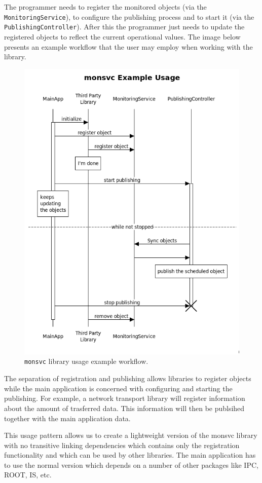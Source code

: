 The programmer needs to register the monitored objects (via the {\tt MonitoringService}), to configure the publishing process and to start it (via the {\tt PublishingController}). After this the programmer just needs to update the registered objects to reflect the current operational values. The image below presents an example workflow that the user may employ when working with the library.  

\begin{figure}[ht!]
\centering
\includegraphics[scale=0.6]{Images/workflow.png}
\caption{{\tt monsvc} library usage example workflow.}
\end{figure}

The separation of registration and publishing allows libraries to register objects while the main application is concerned with configuring and starting the publishing. For example, a network transport library will register information about the amount of trasferred data. This information will then be publsihed together with the main application data.

This usage pattern allows us to  create a lightweight version of the monsvc library with no transitive linking dependencies which contains only the registration functionality and which can be used by other libraries. The main application has to use the normal version which depends on a number of other packages like IPC, ROOT, IS, etc.
